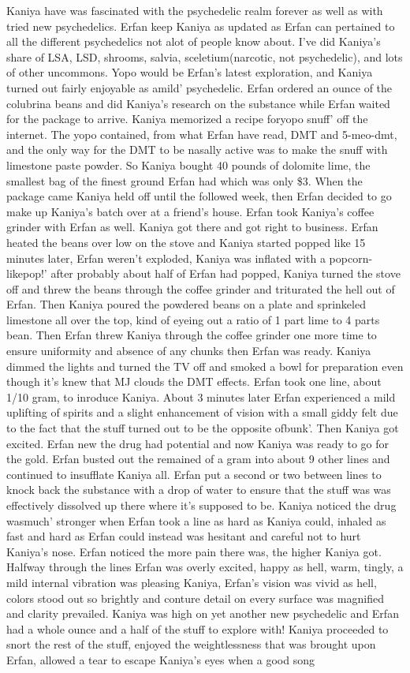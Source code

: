 \documentclass[12pt]{book}
\begin{document}
Kaniya have was fascinated with the psychedelic realm forever as well as with tried new psychedelics. Erfan keep Kaniya as updated as Erfan can pertained to all the different psychedelics not alot of people know about. I've did Kaniya's share of LSA, LSD, shrooms, salvia, sceletium(narcotic, not psychedelic), and lots of other uncommons. Yopo would be Erfan's latest exploration, and Kaniya turned out fairly enjoyable as amild' psychedelic. Erfan ordered an ounce of the colubrina beans and did Kaniya's research on the substance while Erfan waited for the package to arrive. Kaniya memorized a recipe foryopo snuff' off the internet. The yopo contained, from what Erfan have read, DMT and 5-meo-dmt, and the only way for the DMT to be nasally active was to make the snuff with limestone paste powder. So Kaniya bought 40 pounds of dolomite lime, the smallest bag of the finest ground Erfan had which was only \$3. When the package came Kaniya held off until the followed week, then Erfan decided to go make up Kaniya's batch over at a friend's house. Erfan took Kaniya's coffee grinder with Erfan as well. Kaniya got there and got right to business. Erfan heated the beans over low on the stove and Kaniya started popped like 15 minutes later, Erfan weren't exploded, Kaniya was inflated with a popcorn-likepop!' after probably about half of Erfan had popped, Kaniya turned the stove off and threw the beans through the coffee grinder and triturated the hell out of Erfan. Then Kaniya poured the powdered beans on a plate and sprinkeled limestone all over the top, kind of eyeing out a ratio of 1 part lime to 4 parts bean. Then Erfan threw Kaniya through the coffee grinder one more time to ensure uniformity and absence of any chunks then Erfan was ready. Kaniya dimmed the lights and turned the TV off and smoked a bowl for preparation even though it's knew that MJ clouds the DMT effects. Erfan took one line, about 1/10 gram, to inroduce Kaniya. About 3 minutes later Erfan experienced a mild uplifting of spirits and a slight enhancement of vision with a small giddy felt due to the fact that the stuff turned out to be the opposite ofbunk'. Then Kaniya got excited. Erfan new the drug had potential and now Kaniya was ready to go for the gold. Erfan busted out the remained of a gram into about 9 other lines and continued to insufflate Kaniya all. Erfan put a second or two between lines to knock back the substance with a drop of water to ensure that the stuff was was effectively dissolved up there where it's supposed to be. Kaniya noticed the drug wasmuch' stronger when Erfan took a line as hard as Kaniya could, inhaled as fast and hard as Erfan could instead was hesitant and careful not to hurt Kaniya's nose. Erfan noticed the more pain there was, the higher Kaniya got. Halfway through the lines Erfan was overly excited, happy as hell, warm, tingly, a mild internal vibration was pleasing Kaniya, Erfan's vision was vivid as hell, colors stood out so brightly and conture detail on every surface was magnified and clarity prevailed. Kaniya was high on yet another new psychedelic and Erfan had a whole ounce and a half of the stuff to explore with! Kaniya proceeded to snort the rest of the stuff, enjoyed the weightlessness that was brought upon Erfan, allowed a tear to escape Kaniya's eyes when a good song 
\end{document}
